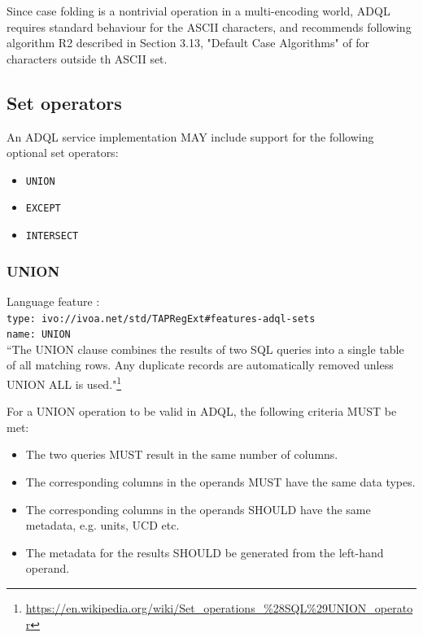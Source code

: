\documentclass[11pt,a4paper]{ivoa}
\begin{document}
Since case folding is a nontrivial operation in a multi-encoding world,
ADQL requires standard behaviour for the ASCII characters, and recommends
following algorithm R2 described in Section 3.13, "Default Case Algorithms"
of \citet{std:UNICODE} for characters outside th ASCII set.

\subsection{Set operators}
\label{sec:set.operators}

An ADQL service implementation MAY include support for the following optional
set operators:

\begin{itemize}
    \item \verb:UNION:
    \item \verb:EXCEPT:
    \item \verb:INTERSECT:
\end{itemize}

\subsubsection{UNION}
{\footnotesize Language feature :}\\
{\footnotesize \verb|type: ivo://ivoa.net/std/TAPRegExt#features-adql-sets|}\\
{\footnotesize \verb|name: UNION|}\\

``The UNION clause combines the results of two SQL queries into a single
table of all matching rows. Any duplicate records are automatically removed
unless UNION ALL is used."\footnote{\url{https://en.wikipedia.org/wiki/Set\_operations\_\%28SQL\%29UNION\_operator}}

For a UNION operation to be valid in ADQL, the following criteria MUST be met:

\begin{itemize}
    \item The two queries MUST result in the same number of columns.
    \item The corresponding columns in the operands MUST have the same data types.
    \item The corresponding columns in the operands SHOULD have the same metadata, e.g. units, UCD etc.
    \item The metadata for the results SHOULD be generated from the left-hand operand.
\end{itemize}
\end{document}
